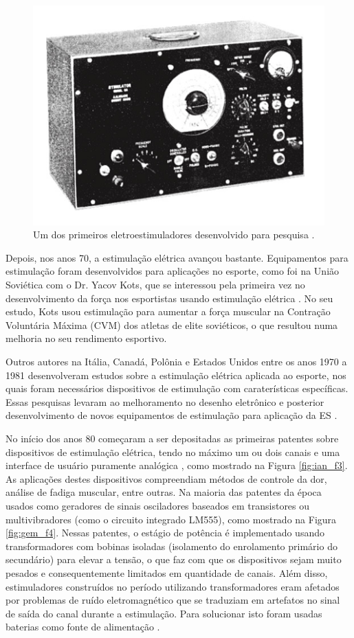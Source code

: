 \begin{figure}
    \centering %
    \includegraphics[width=0.4\linewidth]{figs/Fig_c3/pes_f2}
    \caption{Um dos primeiros eletroestimuladores desenvolvido para pesquisa \cite{Geddes1994TheBiology}.}
    \label{fig:pes_f2}
\end{figure}


Depois, nos anos 70, a estimulação elétrica avançou bastante. Equipamentos para estimulação foram desenvolvidos para aplicações no esporte, como foi na União Soviética com o Dr. Yacov Kots, que se interessou pela primeira vez no desenvolvimento da força nos esportistas usando estimulação elétrica \cite{Cometti2007BibliografiaElectroestimulacion}. No seu estudo, Kots usou estimulação para aumentar a força muscular na Contração Voluntária Máxima (\acrshort{CVM}) dos atletas de elite soviéticos, o que resultou numa melhoria no seu rendimento esportivo.

Outros autores na Itália, Canadá, Polônia e Estados Unidos entre os anos 1970 a 1981 desenvolveram estudos sobre a estimulação elétrica aplicada ao esporte, nos quais foram necessários dispositivos de estimulação com caraterísticas específicas. Essas pesquisas levaram ao melhoramento no desenho eletrônico e posterior desenvolvimento de novos equipamentos de estimulação para aplicação da \acrshort{ES} \cite{Cometti2007BibliografiaElectroestimulacion, Martin2014PracticasFisioterapia}.

No início dos anos 80 começaram a ser depositadas as primeiras patentes sobre dispositivos de estimulação elétrica, tendo no máximo um ou dois canais e uma interface de usuário puramente analógica \cite{Hudleson1980ApparatusStimulator, Agarwala1986ProgrammableSystem, H.1990PowerStimulator, Reiss1996CombinationSystem}, como mostrado na Figura \ref{fig:ian_f3}. As aplicações destes dispositivos compreendiam métodos de controle da dor, análise de fadiga muscular, entre outras. Na maioria das patentes da época usados como geradores de sinais osciladores baseados em transistores ou multivibradores (como o circuito integrado LM555), como mostrado na Figura \ref{fig:gem_f4}. Nessas patentes, o estágio de potência é implementado usando transformadores com bobinas isoladas (isolamento do enrolamento primário do secundário) para elevar a tensão, o que faz com que os dispositivos sejam muito pesados e consequentemente limitados em quantidade de canais. Além disso, estimuladores construídos no período utilizando transformadores eram afetados por problemas de ruído eletromagnético que se traduziam em artefatos no sinal de saída do canal durante a estimulação. Para solucionar isto foram usadas baterias como fonte de alimentação \cite{Jaw1995Microcomputer-basedStimulator, Hudleson1980ApparatusStimulator}.

